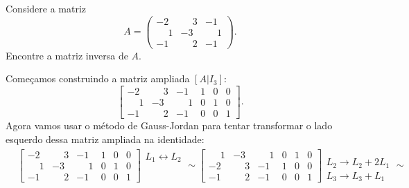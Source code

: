 \begin{exemplo}
    Considere a matriz
    \[
        A = \begin{pmatrix}
            -2 & \phantom{-}3 & -1\\
            \phantom{-}1 & -3 & \phantom{-}1\\
            -1 & \phantom{-}2 & -1
        \end{pmatrix}.
    \]
    Encontre a matriz inversa de $A$.
    \begin{solucao}
        Começamos construindo a matriz ampliada $[A|I_3]$:
        \[
            \left[\begin{array}{ccc|ccc}
            -2 & \phantom{-}3 & -1 & 1 & 0 & 0\\
            \phantom{-}1 & -3 & \phantom{-}1 & 0 & 1 & 0\\
            -1 & \phantom{-}2 & -1 & 0 & 0 & 1
        \end{array}\right].
        \]
        Agora vamos usar o método de Gauss-Jordan para tentar transformar o  lado esquerdo dessa matriz ampliada na identidade:
        \begin{align*}
            &\left[
                \begin{array}{ccc|ccc}
                    -2 & \phantom{-}3 & -1 & 1 & 0 & 0\\
                    \phantom{-}1 & -3 & \phantom{-}1 & 0 & 1 & 0\\
                    -1 & \phantom{-}2 & -1 & 0 & 0 & 1
                \end{array}
            \right]
            \begin{array}{l}
                L_1 \leftrightarrow L_2\\\phantom{x}\\\phantom{x}
            \end{array}\sim
            \left[
                \begin{array}{ccc|ccc}
                    \phantom{-}1 & -3 & \phantom{-}1 & 0 & 1 & 0\\
                    -2 & \phantom{-}3 & -1 & 1 & 0 & 0\\
                    -1 & \phantom{-}2 & -1 & 0 & 0 & 1
                \end{array}
            \right]
            \begin{array}{l}
                \phantom{x}\\L_2 \to L_2 + 2L_1\\L_3 \to L_3 + L_1
            \end{array}\sim\\

\end{align*}
\end{solucao}
\end{exemplo}
